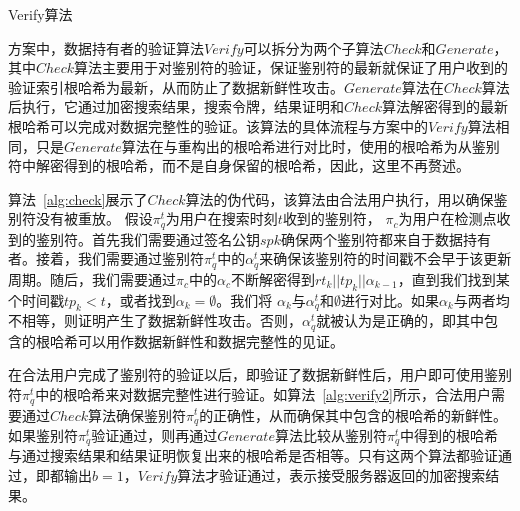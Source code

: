 \begin{algorithm}[t]
  \caption{Verify算法}
  \label{alg:verify2}
  \begin{algorithmic}[1]

  \end{algorithmic}
\end{algorithm}

\multi 方案中，数据持有者的验证算法$Verify$可以拆分为两个子算法$Check$和$Generate$，其中$Check$算法主要用于对鉴别符的验证，保证鉴别符的最新就保证了用户收到的验证索引根哈希为最新，从而防止了数据新鲜性攻击。$Generate$算法在$Check$算法后执行，它通过加密搜索结果，搜索令牌，结果证明和$Check$算法解密得到的最新根哈希可以完成对数据完整性的验证。该算法的具体流程与\single 方案中的$Verify$算法相同，只是$Generate$算法在与重构出的根哈希进行对比时，使用的根哈希为从鉴别符中解密得到的根哈希，而不是自身保留的根哈希，因此，这里不再赘述。

算法~\ref{alg:check}展示了$Check$算法的伪代码，该算法由合法用户执行，用以确保鉴别符没有被重放。
假设$\pi^t_q$为用户在搜索时刻$t$收到的鉴别符， $\pi_c$为用户在检测点收到的鉴别符。首先我们需要通过签名公钥$spk$确保两个鉴别符都来自于数据持有者。接着，我们需要通过鉴别符$\pi^t_q$中的$\alpha^t_q$来确保该鉴别符的时间戳不会早于该更新周期。随后，我们需要通过$\pi_c$中的$\alpha_c$不断解密得到$rt_k||tp_k||\alpha_{k-1}$，直到我们找到某个时间戳$tp_k < t$，或者找到$\alpha_k = \emptyset$。我们将  $\alpha_k$与$\alpha^t_q$和$\emptyset$进行对比。如果$\alpha_k$与两者均不相等，则证明产生了数据新鲜性攻击。否则，$\alpha^t_q$就被认为是正确的，即其中包含的根哈希可以用作数据新鲜性和数据完整性的见证。



在合法用户完成了鉴别符的验证以后，即验证了数据新鲜性后，用户即可使用鉴别符$\pi^t_q$中的根哈希来对数据完整性进行验证。如算法~\ref{alg:verify2}所示，合法用户需要通过$Check$算法确保鉴别符$\pi^t_q$的正确性，从而确保其中包含的根哈希的新鲜性。如果鉴别符$\pi^t_q$验证通过，则再通过$Generate$算法比较从鉴别符$\pi^t_q$中得到的根哈希与通过搜索结果和结果证明恢复出来的根哈希是否相等。只有这两个算法都验证通过，即都输出$b=1$，$Verify$算法才验证通过，表示接受服务器返回的加密搜索结果。



